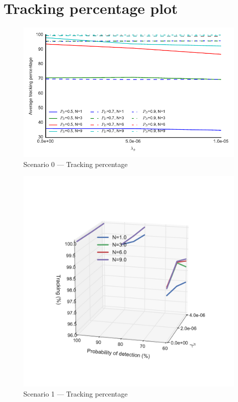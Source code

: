 
\chapter{Tracking percentage plot}
{
\setlength{\intextsep}{0mm}
\begin{figure}[H]
\centering
\includegraphics[height = .46\textheight]{Figures/plots/Scenario0_Tracking-TrackingPercentage.pdf}
\caption{Scenario 0 --- Tracking percentage}\label{fig:scenario0_tracking_percentage}
\end{figure}

\begin{figure}
\centering
\includegraphics[height = .46\textheight]{Figures/plots/Scenario1_Tracking-TrackingPercentage.pdf}
\caption{Scenario 1 --- Tracking percentage}\label{fig:scenario1_tracking_percentage}


\end{figure}}
